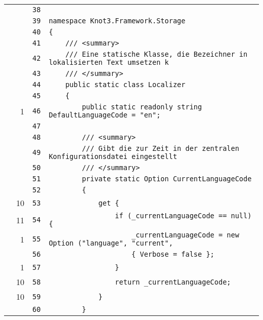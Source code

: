 \documentclass[a4paper,10pt]{article}
\begin{document}
\begin{longtable}[l]{lrrl}
\cellcolor{gray} &  & \verb~38~ & \verb~~\\
\cellcolor{gray} &  & \verb~39~ & \verb~namespace Knot3.Framework.Storage~\\
\cellcolor{gray} &  & \verb~40~ & \verb~{~\\
\cellcolor{gray} &  & \verb~41~ & \verb~    /// <summary>~\\
\cellcolor{gray} &  & \verb~42~ & \verb~    /// Eine statische Klasse, die Bezeichner in lokalisierten Text umsetzen k~\\
\cellcolor{gray} &  & \verb~43~ & \verb~    /// </summary>~\\
\cellcolor{gray} &  & \verb~44~ & \verb~    public static class Localizer~\\
\cellcolor{gray} &  & \verb~45~ & \verb~    {~\\
\cellcolor{green} & 1 & \verb~46~ & \verb~        public static readonly string DefaultLanguageCode = "en";~\\
\cellcolor{gray} &  & \verb~47~ & \verb~~\\
\cellcolor{gray} &  & \verb~48~ & \verb~        /// <summary>~\\
\cellcolor{gray} &  & \verb~49~ & \verb~        /// Gibt die zur Zeit in der zentralen Konfigurationsdatei eingestellt~\\
\cellcolor{gray} &  & \verb~50~ & \verb~        /// </summary>~\\
\cellcolor{gray} &  & \verb~51~ & \verb~        private static Option CurrentLanguageCode~\\
\cellcolor{gray} &  & \verb~52~ & \verb~        {~\\
\cellcolor{green} & 10 & \verb~53~ & \verb~            get {~\\
\cellcolor{green} & 11 & \verb~54~ & \verb~                if (_currentLanguageCode == null) {~\\
\cellcolor{green} & 1 & \verb~55~ & \verb~                    _currentLanguageCode = new Option ("language", "current", ~\\
\cellcolor{gray} &  & \verb~56~ & \verb~                    { Verbose = false };~\\
\cellcolor{green} & 1 & \verb~57~ & \verb~                }~\\
\cellcolor{green} & 10 & \verb~58~ & \verb~                return _currentLanguageCode;~\\
\cellcolor{green} & 10 & \verb~59~ & \verb~            }~\\
\cellcolor{gray} &  & \verb~60~ & \verb~        }~\\

\end{longtable}
\end{document}

